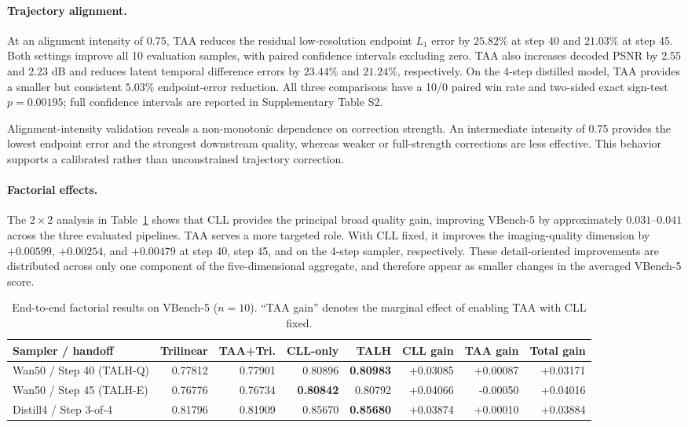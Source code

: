 \paragraph{Trajectory alignment.}
At an alignment intensity of 0.75, TAA reduces the residual
low-resolution endpoint \(L_1\) error by \(25.82\%\) at step 40 and
\(21.03\%\) at step 45. Both settings improve all 10 evaluation
samples, with paired confidence intervals excluding zero. TAA also
increases decoded PSNR by 2.55 and 2.23 dB and reduces latent temporal
difference errors by \(23.44\%\) and \(21.24\%\), respectively. On the
4-step distilled model, TAA provides a smaller but consistent
\(5.03\%\) endpoint-error reduction. All three comparisons have a
10/0 paired win rate and two-sided exact sign-test \(p=0.00195\); full
confidence intervals are reported in Supplementary Table S2.

Alignment-intensity validation reveals a non-monotonic dependence on
correction strength. An intermediate intensity of 0.75 provides the
lowest endpoint error and the strongest downstream quality, whereas
weaker or full-strength corrections are less effective. This behavior
supports a calibrated rather than unconstrained trajectory correction.

\paragraph{Factorial effects.}
The \(2\times2\) analysis in Table~\ref{tab:factorial} shows that CLL
provides the principal broad quality gain, improving VBench-5 by
approximately \(0.031\)--\(0.041\) across the three evaluated
pipelines. TAA serves a more targeted role. With CLL fixed, it improves
the imaging-quality dimension by \(+0.00599\), \(+0.00254\), and
\(+0.00479\) at step 40, step 45, and on the 4-step sampler,
respectively. These detail-oriented improvements are distributed across
only one component of the five-dimensional aggregate, and therefore
appear as smaller changes in the averaged VBench-5 score.

\begin{table}[!t]
\centering
\footnotesize
\setlength{\tabcolsep}{4.5pt}
\begin{tabular}{lrrrrrrr}
\toprule
Sampler / handoff & Trilinear & TAA+Tri. & CLL-only & TALH &
CLL gain & TAA gain & Total gain \\
\midrule
Wan50 / Step 40 (TALH-Q) & 0.77812 & 0.77901 & 0.80896 &
\textbf{0.80983} & +0.03085 & +0.00087 & +0.03171 \\
Wan50 / Step 45 (TALH-E) & 0.76776 & 0.76734 &
\textbf{0.80842} & 0.80792 & +0.04066 & -0.00050 & +0.04016 \\
Distill4 / Step 3-of-4 & 0.81796 & 0.81909 & 0.85670 &
\textbf{0.85680} & +0.03874 & +0.00010 & +0.03884 \\
\bottomrule
\end{tabular}
\caption{End-to-end factorial results on VBench-5 (\(n=10\)).
``TAA gain'' denotes the marginal effect of enabling TAA with CLL
fixed.}
\label{tab:factorial}
\end{table}

